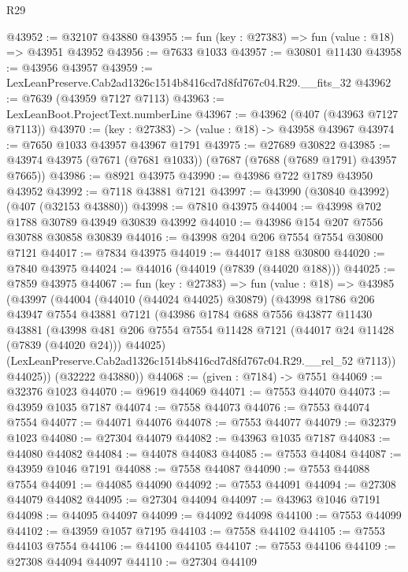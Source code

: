 \begin{lexlean}{R29}
\begin{coremodule}
@43952 := @32107 @43880
@43955 := fun (key : @27383) => fun (value : @18) => @43951 @43952
@43956 := @7633 @1033
@43957 := @30801 @11430
@43958 := @43956 @43957
@43959 := LexLeanPreserve.Cab2ad1326c1514b8416cd7d8fd767c04.R29.__fits_32
@43962 := @7639 (@43959 @7127 @7113)
@43963 := LexLeanBoot.ProjectText.numberLine
@43967 := @43962 (@407 (@43963 @7127 @7113))
@43970 := (key : @27383) -> (value : @18) -> @43958 @43967
@43974 := @7650 @1033 @43957 @43967 @1791
@43975 := @27689 @30822
@43985 := @43974 @43975 (@7671 (@7681 @1033)) (@7687 (@7688 (@7689 @1791) @43957 @7665))
@43986 := @8921 @43975
@43990 := @43986 @722 @1789 @43950 @43952
@43992 := @7118 @43881 @7121
@43997 := @43990 (@30840 @43992) (@407 (@32153 @43880))
@43998 := @7810 @43975
@44004 := @43998 @702 @1788 @30789 @43949 @30839 @43992
@44010 := @43986 @154 @207 @7556 @30788 @30858 @30839
@44016 := @43998 @204 @206 @7554 @7554 @30800 @7121
@44017 := @7834 @43975
@44019 := @44017 @188 @30800
@44020 := @7840 @43975
@44024 := @44016 (@44019 (@7839 (@44020 @188)))
@44025 := @7859 @43975
@44067 := fun (key : @27383) =>
  fun (value : @18) =>
  @43985
    (@43997
      (@44004
        (@44010 (@44024 @44025) @30879)
        (@43998
          @1786
          @206
          @43947
          @7554
          @43881
          @7121
          (@43986
            @1784
            @688
            @7556
            @43877
            @11430
            @43881
            (@43998
              @481
              @206
              @7554
              @7554
              @11428
              @7121
              (@44017 @24 @11428 (@7839 (@44020 @24)))
              @44025)
            (LexLeanPreserve.Cab2ad1326c1514b8416cd7d8fd767c04.R29.__rel_52 @7113))
          @44025))
      (@32222 @43880))
@44068 := (given : @7184) -> @7551
@44069 := @32376 @1023
@44070 := @9619 @44069
@44071 := @7553 @44070
@44073 := @43959 @1035 @7187
@44074 := @7558 @44073
@44076 := @7553 @44074 @7554
@44077 := @44071 @44076
@44078 := @7553 @44077
@44079 := @32379 @1023
@44080 := @27304 @44079
@44082 := @43963 @1035 @7187
@44083 := @44080 @44082
@44084 := @44078 @44083
@44085 := @7553 @44084
@44087 := @43959 @1046 @7191
@44088 := @7558 @44087
@44090 := @7553 @44088 @7554
@44091 := @44085 @44090
@44092 := @7553 @44091
@44094 := @27308 @44079 @44082
@44095 := @27304 @44094
@44097 := @43963 @1046 @7191
@44098 := @44095 @44097
@44099 := @44092 @44098
@44100 := @7553 @44099
@44102 := @43959 @1057 @7195
@44103 := @7558 @44102
@44105 := @7553 @44103 @7554
@44106 := @44100 @44105
@44107 := @7553 @44106
@44109 := @27308 @44094 @44097
@44110 := @27304 @44109

\end{coremodule}
\end{lexlean}
